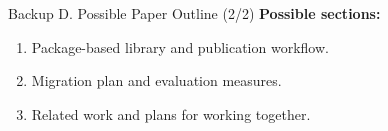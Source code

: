 \documentclass[aspectratio=169,11pt]{beamer}
\begin{document}
\begin{frame}[fragile,t]{Backup D. Possible Paper Outline (2/2)}
\smallskip
\textbf{Possible sections:}
\begin{enumerate}
\setlength{\itemsep}{1pt}
\setlength{\parsep}{0pt}
\setlength{\parskip}{0pt}
\item Package-based library and publication workflow.
\item Migration plan and evaluation measures.
\item Related work and plans for working together.
\end{enumerate}
\end{frame}
\end{document}
